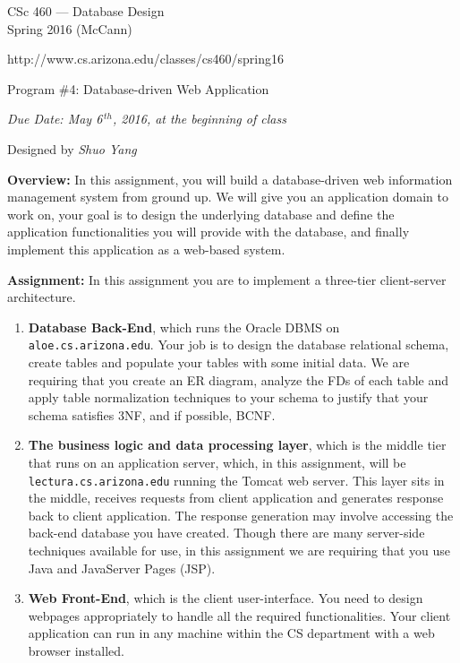 \documentclass{article}
\begin{document}
\pagestyle{empty}			%

\begin{center}
CSc 460 --- Database Design \\
Spring 2016 (McCann)

http://www.cs.arizona.edu/classes/cs460/spring16

\selectfont   %
{\large Program \#4:  Database-driven Web Application}
\normalfont

{\it Due Date:  May 6$^{\, th}$, 2016, at the beginning of class}

Designed by {\it Shuo Yang}

\end{center}


\textbf{Overview:}
In this assignment, you will build a database-driven web information
management system from ground up. We will give you an application
domain to work on, your goal is to design the underlying database and
define the application functionalities you will provide with the
database, and finally implement this application as a web-based system.


\textbf{Assignment:}
In this assignment you are to implement a three-tier client-server
architecture.

\begin{enumerate}
\item \textbf{Database Back-End}, which runs the Oracle DBMS
  on \texttt{aloe.cs.arizona.edu}. Your job is to design the database relational
  schema, create tables and populate your tables with some initial
  data. We are requiring that you create an ER diagram, analyze the
  FDs of each table and apply table normalization techniques to your
  schema to justify that your schema satisfies 3NF, and if possible,
  BCNF.

\item \textbf{The business logic and data processing layer}, which is
  the middle tier that runs on an application server, which, in this
  assignment, will be \texttt{lectura.cs.arizona.edu} running the Tomcat
  web server. This layer sits in the middle, receives requests from
  client application and generates response back to client
  application. The response generation may involve accessing the
  back-end database you have created. Though there are many
  server-side techniques available for use, in this assignment we are
  requiring that you use Java and JavaServer Pages (JSP).

\item \textbf{Web Front-End}, which is the client user-interface. You
  need to design webpages appropriately to handle all the required
  functionalities. Your client application can run in any machine
  within the CS department with a web browser installed.
\end{enumerate}
\end{document}
